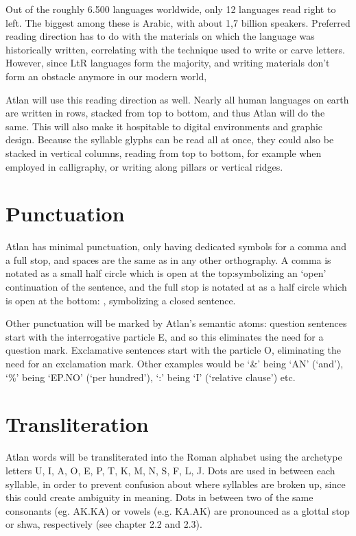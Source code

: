 Out of the roughly 6.500 languages worldwide, only 12 languages read right to left. The biggest among these is Arabic, with about 1,7 billion speakers. Preferred reading direction has to do with the materials on which the language was historically written, correlating with the technique used to write or carve letters. However, since LtR languages form the majority, and writing materials don’t form an obstacle anymore in our modern world, 

Atlan will use this reading direction as well. Nearly all human languages on earth are written in rows, stacked from top to bottom, and thus Atlan will do the same. This will also make it hospitable to digital environments and graphic design. Because the syllable glyphs can be read all at once, they could also be stacked in vertical columns, reading from top to bottom, for example when employed in calligraphy, or writing along pillars or vertical ridges. 
\vfill

\section{Punctuation}
Atlan has minimal punctuation, only having dedicated symbols for a comma and a full stop, and spaces are the same as in any other orthography. A comma is notated as a small half circle which is open at the top:\comma symbolizing an ‘open’ continuation of the sentence, and the full stop is notated at as a half circle which is open at the bottom: \period , symbolizing a closed sentence. 

Other punctuation will be marked by Atlan’s semantic atoms: question sentences start with the interrogative particle E, and so this eliminates the need for a question mark. Exclamative sentences start with the particle O, eliminating the need for an exclamation mark. Other examples would be ‘\&’ being ‘AN’ (‘and’), ‘\%’ being ‘EP.NO’ (‘per hundred’), ‘:’ being ‘I’ (‘relative clause’) etc. 

\section{Transliteration}
Atlan words will be transliterated into the Roman alphabet using the archetype letters U, I, A, O, E, P, T, K, M, N, S, F, L, J. Dots are used in between each syllable, in order to prevent confusion about where syllables are broken up, since this could create ambiguity in meaning. Dots in between two of the same consonants (eg. AK.KA) or vowels (e.g. KA.AK) are pronounced as a glottal stop or shwa, respectively (see chapter 2.2 and 2.3). 

